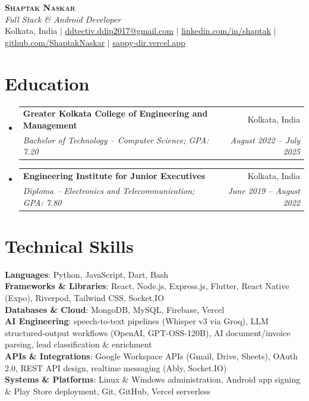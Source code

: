 \documentclass[letterpaper,10pt]{article}
\makeatletter
\newcommand{\resumeSubheading}[4]{
  \vspace{-2pt}\item
    \begin{tabular*}{0.97\textwidth}[t]{l@{\extracolsep{\fill}}r}
      \textbf{#1} & #2 \\
      \textit{\small#3} & \textit{\small #4} \\
    \end{tabular*}\vspace{-7pt}
}
\newcommand{\resumeSubHeadingListStart}{\begin{itemize}[leftmargin=0.15in, label={}]}
\newcommand{\resumeSubHeadingListEnd}{\end{itemize}}
\makeatother
\begin{document}
\begin{center}
    \textbf{\Huge \scshape Shaptak Naskar} \\ \vspace{4pt}
{\large\textit{Full Stack \& Android Developer}} \\ \vspace{6pt}
    \small Kolkata, India $|$
    \href{mailto:ddtectiv.ddip2017@gmail.com}{\underline{ddtectiv.ddip2017@gmail.com}} $|$
    \href{https://linkedin.com/in/shaptak}{\underline{linkedin.com/in/shaptak}} $|$
    \href{https://github.com/ShaptakNaskar}{\underline{github.com/ShaptakNaskar}} $|$
    \href{https://sappy-dir.vercel.app/}{\underline{sappy-dir.vercel.app}}
\end{center}

\section{Education}
  \resumeSubHeadingListStart
    \resumeSubheading
      {Greater Kolkata College of Engineering and Management}{Kolkata, India}
      {Bachelor of Technology -- Computer Science; GPA: 7.20}{August 2022 -- July 2025}
    \resumeSubheading
      {Engineering Institute for Junior Executives}{Kolkata, India}
      {Diploma -- Electronics and Telecommunication; GPA: 7.80}{June 2019 -- August 2022}
  \resumeSubHeadingListEnd

\section{Technical Skills}
 \begin{itemize}[leftmargin=0.15in, label={}]
    \small{\item{
     \textbf{Languages}{: Python, JavaScript, Dart, Bash} \\
     \textbf{Frameworks \& Libraries}{: React, Node.js, Express.js, Flutter, React Native (Expo), Riverpod, Tailwind CSS, Socket.IO} \\
     \textbf{Databases \& Cloud}{: MongoDB, MySQL, Firebase, Vercel} \\
     \textbf{AI Engineering}{: speech-to-text pipelines (Whisper v3 via Groq), LLM structured-output workflows (OpenAI, GPT-OSS-120B), AI document/invoice parsing, lead classification \& enrichment} \\
     \textbf{APIs \& Integrations}{: Google Workspace APIs (Gmail, Drive, Sheets), OAuth 2.0, REST API design, realtime messaging (Ably, Socket.IO)} \\
     \textbf{Systems \& Platforms}{: Linux \& Windows administration, Android app signing \& Play Store deployment, Git, GitHub, Vercel serverless}
    }}
 \end{itemize}
\end{document}
